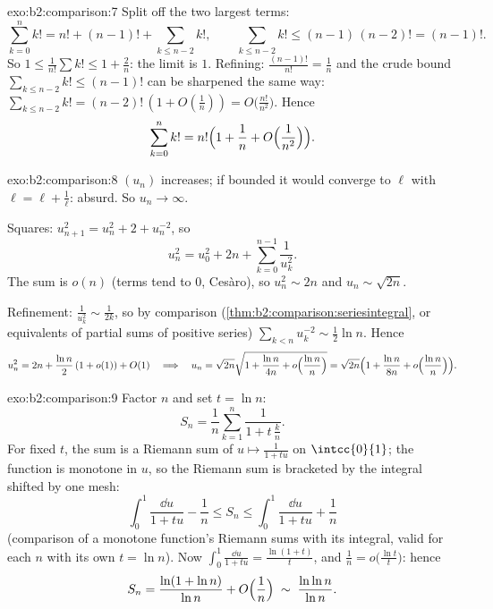 \begin{solution}{exo:b2:comparison:7}
Split off the two largest terms:
\[
\sum_{k=0}^{n} k! = n! + (n-1)! + \sum_{k \leq n-2} k! ,
\qquad
\sum_{k\leq n-2} k! \leq (n-1)\,(n-2)! = (n-1)! .
\]
So $1 \leq \frac{1}{n!}\sum k! \leq 1 + \frac{2}{n}$: the limit is
$1$. Refining: $\frac{(n-1)!}{n!} = \frac1n$ and the crude bound
$\sum_{k \leq n-2}k! \leq (n-1)!$ can be sharpened the same way:
$\sum_{k\leq n-2} k! = (n-2)!\,(1 + O(\frac1n)) = O\bigl(\frac{n!}{n^2}\bigr)$.
Hence
\[
\sum_{k=0}^{n} k! = n!\Bigl(1 + \frac1n + O\Bigl(\frac{1}{n^2}\Bigr)\Bigr).
\]
\end{solution}

\begin{solution}{exo:b2:comparison:8}
$(u_n)$ increases; if bounded it would converge to $\ell$ with
$\ell = \ell + \frac1\ell$: absurd. So $u_n \to \infty$.

Squares: $u_{n+1}^2 = u_n^2 + 2 + u_n^{-2}$, so
\[
u_n^2 = u_0^2 + 2n + \sum_{k=0}^{n-1} \frac{1}{u_k^2} .
\]
The sum is $o(n)$ (terms tend to $0$, Ces\`aro), so $u_n^2 \sim 2n$
and $u_n \sim \sqrt{2n}$.

Refinement: $\frac{1}{u_k^2} \sim \frac{1}{2k}$, so by comparison
(\cref{thm:b2:comparison:seriesintegral}, or equivalents of partial
sums of positive series) $\sum_{k<n} u_k^{-2} \sim \frac12 \ln n$.
Hence
\[
u_n^2 = 2n + \frac{\ln n}{2}\,(1 + o(1)) + O(1)
\quad\Longrightarrow\quad
u_n = \sqrt{2n}\sqrt{1 + \frac{\ln n}{4n} + o\Bigl(\frac{\ln
n}{n}\Bigr)}
= \sqrt{2n}\Bigl(1 + \frac{\ln n}{8n} + o\Bigl(\frac{\ln
n}{n}\Bigr)\Bigr).
\]
\end{solution}

\begin{solution}{exo:b2:comparison:9}
Factor $n$ and set $t = \ln n$:
\[
S_n = \frac1n \sum_{k=1}^{n} \frac{1}{1 + t\,\frac kn} .
\]
For fixed $t$, the sum is a Riemann sum of $u \mapsto \frac{1}{1 +
tu}$ on $\intcc{0}{1}$; the function is monotone in $u$, so the
Riemann sum is bracketed by the integral shifted by one mesh:
\[
\int_0^1 \frac{\dd u}{1 + tu} - \frac1n
\leq S_n \leq \int_0^1 \frac{\dd u}{1 + tu} + \frac1n
\]
(comparison of a monotone function's Riemann sums with its
integral, valid for each $n$ with its own $t = \ln n$). Now
$\int_0^1 \frac{\dd u}{1 + tu} = \frac{\ln(1 + t)}{t}$, and
$\frac1n = o\bigl(\frac{\ln t}{t}\bigr)$: hence
\[
S_n = \frac{\ln(1 + \ln n)}{\ln n} + O\Bigl(\frac 1n\Bigr)
\;\sim\; \frac{\ln\ln n}{\ln n} .
\]
\end{solution}

